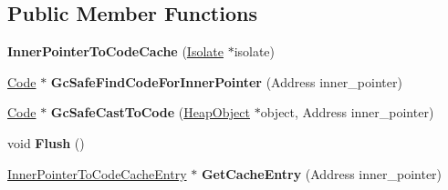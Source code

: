 \subsection*{Public Member Functions}
\begin{DoxyCompactItemize}
\item 
{\bfseries Inner\+Pointer\+To\+Code\+Cache} (\hyperlink{classv8_1_1internal_1_1_isolate}{Isolate} $\ast$isolate)\hypertarget{classv8_1_1internal_1_1_inner_pointer_to_code_cache_aa5648205deaf18119d17308276caa507}{}\label{classv8_1_1internal_1_1_inner_pointer_to_code_cache_aa5648205deaf18119d17308276caa507}

\item 
\hyperlink{classv8_1_1internal_1_1_code}{Code} $\ast$ {\bfseries Gc\+Safe\+Find\+Code\+For\+Inner\+Pointer} (Address inner\+\_\+pointer)\hypertarget{classv8_1_1internal_1_1_inner_pointer_to_code_cache_a1df5ea3dd9db82fd4e5d59036f745f70}{}\label{classv8_1_1internal_1_1_inner_pointer_to_code_cache_a1df5ea3dd9db82fd4e5d59036f745f70}

\item 
\hyperlink{classv8_1_1internal_1_1_code}{Code} $\ast$ {\bfseries Gc\+Safe\+Cast\+To\+Code} (\hyperlink{classv8_1_1internal_1_1_heap_object}{Heap\+Object} $\ast$object, Address inner\+\_\+pointer)\hypertarget{classv8_1_1internal_1_1_inner_pointer_to_code_cache_ac65fa768c44e87a2ed6073f79903d2e6}{}\label{classv8_1_1internal_1_1_inner_pointer_to_code_cache_ac65fa768c44e87a2ed6073f79903d2e6}

\item 
void {\bfseries Flush} ()\hypertarget{classv8_1_1internal_1_1_inner_pointer_to_code_cache_a9a529de6174a47e94e76191e20e59830}{}\label{classv8_1_1internal_1_1_inner_pointer_to_code_cache_a9a529de6174a47e94e76191e20e59830}

\item 
\hyperlink{structv8_1_1internal_1_1_inner_pointer_to_code_cache_1_1_inner_pointer_to_code_cache_entry}{Inner\+Pointer\+To\+Code\+Cache\+Entry} $\ast$ {\bfseries Get\+Cache\+Entry} (Address inner\+\_\+pointer)\hypertarget{classv8_1_1internal_1_1_inner_pointer_to_code_cache_a99ae60417d91f2a5504b40bfc55acc57}{}\label{classv8_1_1internal_1_1_inner_pointer_to_code_cache_a99ae60417d91f2a5504b40bfc55acc57}

\end{DoxyCompactItemize}
